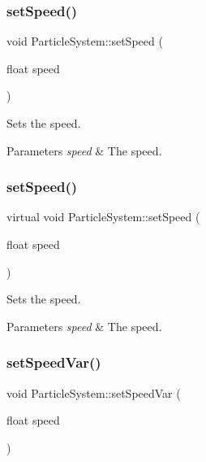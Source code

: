 \subsubsection{\texorpdfstring{set\+Speed()}{setSpeed()}\hspace{0.1cm}{\footnotesize\ttfamily [1/2]}}
{\footnotesize\ttfamily void Particle\+System\+::set\+Speed (\begin{DoxyParamCaption}\item[{float}]{speed }\end{DoxyParamCaption})\hspace{0.3cm}{\ttfamily [virtual]}}

Sets the speed.


\begin{DoxyParams}{Parameters}
{\em speed} & The speed. \\
\hline
\end{DoxyParams}
\mbox{\label{classParticleSystem_a56f9b4f1d63ca8e20ddfa6ecbf4cd6da}} 
\subsubsection{\texorpdfstring{set\+Speed()}{setSpeed()}\hspace{0.1cm}{\footnotesize\ttfamily [2/2]}}
{\footnotesize\ttfamily virtual void Particle\+System\+::set\+Speed (\begin{DoxyParamCaption}\item[{float}]{speed }\end{DoxyParamCaption})\hspace{0.3cm}{\ttfamily [virtual]}}

Sets the speed.


\begin{DoxyParams}{Parameters}
{\em speed} & The speed. \\
\hline
\end{DoxyParams}
\mbox{\label{classParticleSystem_a955801e34086ad0d52af388ba9fd9f42}} 
\subsubsection{\texorpdfstring{set\+Speed\+Var()}{setSpeedVar()}\hspace{0.1cm}{\footnotesize\ttfamily [1/2]}}
{\footnotesize\ttfamily void Particle\+System\+::set\+Speed\+Var (\begin{DoxyParamCaption}\item[{float}]{speed }\end{DoxyParamCaption})\hspace{0.3cm}{\ttfamily [virtual]}}

